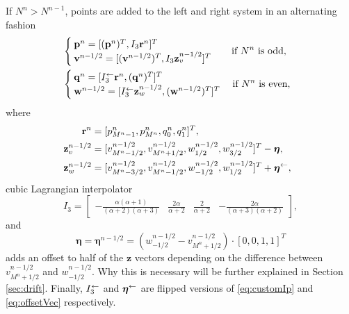 If $N^n>N^{n-1}$, points are added to the left and right system in an alternating fashion %
\begin{equation}\label{eq:addingPoint}
    \begin{aligned}
        \!\!\!\!\!&\begin{cases}
            \mathbf{p}^n = [(\mathbf{p}^n)^T, I_3\mathbf{r}^n]^T\\
            \mathbf{v}^{n-1/2} = [(\mathbf{v}^{n-1/2})^T, I_3\mathbf{z}_v^{n-1/2}]^T
        \end{cases}
        \quad\!\text{if $N^n $ is odd},\\
        \!\!\!\!\!&\begin{cases}
            \mathbf{q}^n = [I_3^\flip\mathbf{r}^n, (\mathbf{q}^n)^T]^T\\
            \mathbf{w}^{n-1/2} = [ I_3^\flip\mathbf{z}_w^{n-1/2},(\mathbf{w}^{n-1/2})^T]^T
        \end{cases}\text{if $ N^n$ is even},
    \end{aligned}
\end{equation}
where
\begin{equation}\label{eq:interpVecs}
    \begin{aligned}
        \!\!\!\!\mathbf{r}^n &= [p_{M^n-1}^n, p_{M^n}^n, q_0^n, q_1^n]^T,\\
        \!\!\!\!\mathbf{z}_v^{n-1/2} &= [v_{M^n-1/2}^{n-1/2}, v_{M^n+1/2}^{n-1/2}, w_{1/2}^{n-1/2}, w_{3/2}^{n-1/2}]^T - \boldsymbol{\eta},\\
        \!\!\!\!\mathbf{z}_w^{n-1/2} &= [v_{M^n-3/2}^{n-1/2}, v_{M^n-1/2}^{n-1/2}, w_{-1/2}^{n-1/2}, w_{1/2}^{n-1/2}]^T+ \boldsymbol{\eta}^{\flip},%
    \end{aligned}
\end{equation}
cubic Lagrangian interpolator
\begin{equation}\label{eq:customIp}
    I_3 = \begin{bmatrix} -\frac{\alpha(\alpha+1)}{(\alpha+2)(\alpha+3)} &\frac{2\alpha}{\alpha+2} &\frac{2}{\alpha+2} 
    &-\frac{2\alpha}{(\alpha+3)(\alpha+2)}
    \end{bmatrix},
\end{equation}
and 
\begin{equation}\label{eq:offsetVec}
    \boldsymbol{\eta} = \boldsymbol{\eta}^{n-1/2}= \left(w_{-1/2}^{n-1/2}-v_{M^n+1/2}^{n
    -1/2}\right)\cdot[0, 0, 1, 1]^T 
\end{equation}
adds an offset to half of the $\mathbf{z}$ vectors depending on the difference between $v_{M^n+1/2}^{n-1/2}$ and $w_{-1/2}^{n-1/2}$. Why this is necessary will be further explained in Section \ref{sec:drift}. Finally, $I_3^\leftarrow$ and $\boldsymbol{\eta}^{\leftarrow}$ are flipped versions of \eqref{eq:customIp} and \eqref{eq:offsetVec} respectively.

